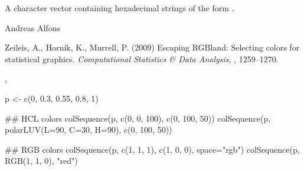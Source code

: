 %
\begin{Value}
A character vector containing hexadecimal strings of the form 
.
\end{Value}
%
\begin{Author}\relax
Andreas Alfons
\end{Author}
%
\begin{References}\relax
Zeileis, A., Hornik, K., Murrell, P. (2009) Escaping RGBland: Selecting 
colors for statistical graphics. \emph{Computational Statistics \& Data 
Analysis}, , 1259--1270.
\end{References}
%
\begin{SeeAlso}\relax
{}, 
\end{SeeAlso}
%
\begin{Examples}
\begin{ExampleCode}
p <- c(0, 0.3, 0.55, 0.8, 1)

## HCL colors
colSequence(p, c(0, 0, 100), c(0, 100, 50))
colSequence(p, polarLUV(L=90, C=30, H=90), c(0, 100, 50))

## RGB colors
colSequence(p, c(1, 1, 1), c(1, 0, 0), space="rgb")
colSequence(p, RGB(1, 1, 0), "red")
\end{ExampleCode}
\end{Examples}
